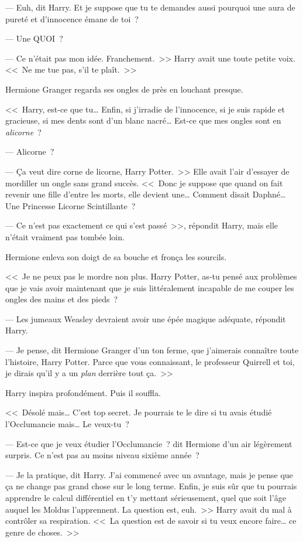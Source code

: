 --- Euh, dit Harry. Et je suppose que tu te demandes aussi pourquoi une aura de pureté et d'innocence émane de toi~?

--- Une QUOI~?

--- Ce n'était pas mon idée. Franchement.~>> Harry avait une toute petite voix. <<~Ne me tue pas, s'il te plaît.~>>

Hermione Granger regarda ses ongles de près en louchant presque.

<<~Harry, est-ce que tu… Enfin, si j'irradie de l'innocence, si je suis rapide et gracieuse, si mes dents sont d'un blanc nacré… Est-ce que mes ongles sont en \emph{alicorne}~?

--- Alicorne~?

--- Ça veut dire corne de licorne, Harry Potter.~>> Elle avait l'air d'essayer de mordiller un ongle sans grand succès. <<~Donc je suppose que quand on fait revenir une fille d'entre les morts, elle devient une… Comment disait Daphné… Une Princesse Licorne Scintillante~?

--- Ce n'est pas exactement ce qui s'est passé~>>, répondit Harry, mais elle n'était vraiment pas tombée loin.

Hermione enleva son doigt de sa bouche et fronça les sourcils.

<<~Je ne peux pas le mordre non plus. Harry Potter, as-tu pensé aux problèmes que je vais avoir maintenant que je suis littéralement incapable de me couper les ongles des mains et des pieds~?

--- Les jumeaux Weasley devraient avoir une épée magique adéquate, répondit Harry.

--- Je pense, dit Hermione Granger d'un ton ferme, que j'aimerais connaître toute l'histoire, Harry Potter. Parce que vous connaissant, le professeur Quirrell et toi, je dirais qu'il y a un \emph{plan} derrière tout ça.~>>

Harry inspira profondément. Puis il souffla.

<<~Désolé mais… C'est top secret. Je pourrais te le dire si tu avais étudié l'Occlumancie mais… Le veux-tu~?

--- Est-ce que je veux étudier l'Occlumancie~? dit Hermione d'un air légèrement surpris. Ce n'est pas au moins niveau sixième année~?

--- Je la pratique, dit Harry. J'ai commencé avec un avantage, mais je pense que ça ne change pas grand chose sur le long terme. Enfin, je suis sûr que tu pourrais apprendre le calcul différentiel en t'y mettant sérieusement, quel que soit l'âge auquel les Moldus l'apprennent. La question est, euh.~>> Harry avait du mal à contrôler sa respiration. <<~La question est de savoir si tu veux encore faire… ce genre de choses.~>>

